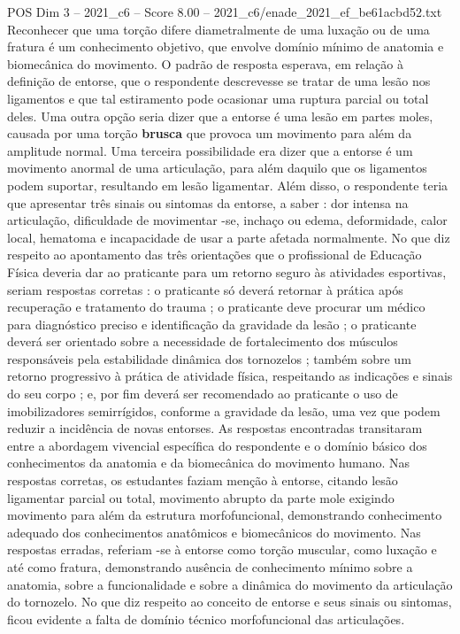 \begin{textsample}{POS Dim 3 – 2021\_c6 – Score 8.00 – 2021\_c6/enade\_2021\_ef\_be61acbd52.txt}
Reconhecer que uma torção difere diametralmente de uma luxação ou de uma fratura é um conhecimento objetivo, que envolve domínio mínimo de anatomia e biomecânica do movimento.
O padrão de resposta esperava, em relação à definição de entorse, que o respondente descrevesse se tratar de uma lesão nos ligamentos e que tal estiramento pode ocasionar uma ruptura parcial ou total deles.
Uma outra opção seria dizer que a entorse é uma lesão em partes moles, causada por uma torção \textbf{brusca} que provoca um movimento para além da amplitude normal.
Uma terceira possibilidade era dizer que a entorse é um movimento anormal de uma articulação, para além daquilo que os ligamentos podem suportar, resultando em lesão ligamentar.
Além disso, o respondente teria que apresentar três sinais ou sintomas da entorse, a saber : dor intensa na articulação, dificuldade de movimentar -se, inchaço ou edema, deformidade, calor local, hematoma e incapacidade de usar a parte afetada normalmente.
No que diz respeito ao apontamento das três orientações que o profissional de Educação Física deveria dar ao praticante para um retorno seguro às atividades esportivas, seriam respostas corretas : o praticante só deverá retornar à prática após recuperação e tratamento do trauma ; o praticante deve procurar um médico para diagnóstico preciso e identificação da gravidade da lesão ; o praticante deverá ser orientado sobre a necessidade de fortalecimento dos músculos responsáveis pela estabilidade dinâmica dos tornozelos ; também sobre um retorno progressivo à prática de atividade física, respeitando as indicações e sinais do seu corpo ; e, por fim deverá ser recomendado ao praticante o uso de imobilizadores semirrígidos, conforme a gravidade da lesão, uma vez que podem reduzir a incidência de novas entorses.
As respostas encontradas transitaram entre a abordagem vivencial específica do respondente e o domínio básico dos conhecimentos da anatomia e da biomecânica do movimento humano.
Nas respostas corretas, os estudantes faziam menção à entorse, citando lesão ligamentar parcial ou total, movimento abrupto da parte mole exigindo movimento para além da estrutura morfofuncional, demonstrando conhecimento adequado dos conhecimentos anatômicos e biomecânicos do movimento.
Nas respostas erradas, referiam -se à entorse como torção muscular, como luxação e até como fratura, demonstrando ausência de conhecimento mínimo sobre a anatomia, sobre a funcionalidade e sobre a dinâmica do movimento da articulação do tornozelo.
No que diz respeito ao conceito de entorse e seus sinais ou sintomas, ficou evidente a falta de domínio técnico morfofuncional das articulações.

\end{textsample}
